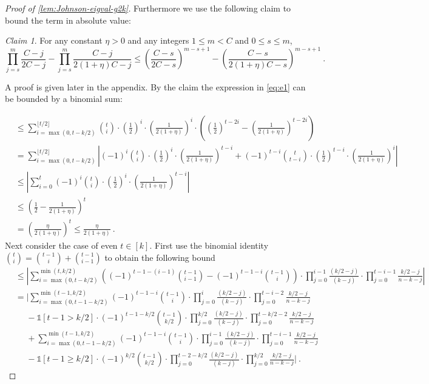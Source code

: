 \documentclass[10pt,a4paper]{article}
\newcommand{\prettyref}[1]{\cref{#1}}
\theoremstyle{definition}
\theoremstyle{remark}
\newtheorem{claim}[theorem]{Claim}
\renewcommand{\le}{\leqslant}
\renewcommand{\ge}{\geqslant}
\numberwithin{equation}{section}
\let\pref=\prettyref
\newcommand{\fl}[1]{\lfloor #1 \rfloor}
\begin{document}
\begin{proof}[Proof of \pref{lem:Johnson-eigval-g2k}]
    Furthermore we use the following claim to bound the term in absolute value: 

    \begin{claim}\label{claim:diff-bound}
        For any constant $\eta > 0$ and any integers $  1\le m < C$ and $0\le s \le m$,
        \[\prod_{j=s}^{m}\frac{C-j}{2C-j} - \prod_{j=s}^{m}\frac{C-j}{2(1+\eta)C-j} \le \left(\frac{C-s}{2C-s}\right)^{m-s+1} - \left(\frac{C-s}{2(1+\eta)C-s}\right)^{m-s+1}~.\]
    \end{claim}
    A proof is given later in the appendix. By the claim the expression in \pref{eq:e1} can be bounded by a binomial sum:

     \begin{align*}
         &\le \sum_{i=\max(0,t-k/2)}^{\fl{t/2}} \binom{t}{i} \cdot \left(\frac{1}{2}\right)^{i}  \cdot \left(\frac{1}{2(1+\eta)}\right)^{i} \cdot \left( \left(\frac{1}{2}\right)^{t-2i} - \left(\frac{1}{2(1+\eta)}\right)^{t-2i} \right) \\
         &= \sum_{i=\max(0,t-k/2)}^{\fl{t/2}} \left| (-1)^{i} \binom{t}{i} \cdot  \left(\frac{1}{2}\right)^{i} \cdot \left(\frac{1}{2(1+\eta)}\right)^{t-i} +  (-1)^{t-i} \binom{t}{t-i} \cdot \left(\frac{1}{2}\right)^{t-i} \cdot \left(\frac{1}{2(1+\eta)}\right)^{i} \right| \\
         &\le \left| \sum_{i=0}^t (-1)^{i} \binom{t}{i} \cdot \left(\frac{1}{2}\right)^{i} \cdot \left(\frac{1}{2(1+\eta)}\right)^{t-i} \right|\\
         &\le \left(\frac{1}{2} - \frac{1}{2(1+\eta)} \right)^t \\
         &=\left (\frac{\eta}{2(1+\eta)} \right)^t 
 \le\frac{\eta}{2(1+\eta)}~.
     \end{align*}
    Next consider the case of even $t\in[k]$. First use the binomial identity $\binom{t}{i} = \binom{t-1}{i}+ \binom{t-1}{i-1}$ to obtain the following bound
    \begin{align*}
        &\le \left|\sum_{i=\max(0,t-k/2) }^{ \min(t,k/2) } \left((-1)^{t-1-(i-1)}\binom{t-1}{i-1} - (-1)^{t-1-i} \binom{t-1}{i} \right)\cdot  \prod_{j=0}^{i-1} \frac{ (k/2-j)}{(k-j)} \cdot \prod_{j=0}^{t-i-1} \frac{  k/2-j}{ n-k-j}  \right|\\
        &=|\sum_{i=\max(0,t-1-k/2) }^{ \min(t-1,k/2)} (-1)^{t-1-i}\binom{t-1}{i}\cdot  \prod_{j=0}^{i} \frac{ (k/2-j)}{(k-j)} \cdot \prod_{j=0}^{t-i-2} \frac{  k/2-j}{ n-k-j} \\
        &~~~~~~- \mathbb{1}[t-1>k/2] \cdot   (-1)^{t-1-k/2}\binom{t-1}{k/2}\cdot  \prod_{j=0}^{k/2} \frac{ (k/2-j)}{(k-j)} \cdot \prod_{j=0}^{t-k/2-2} \frac{  k/2-j}{ n-k-j}\\
        &~~~~~~+\sum_{i=\max(0,t-1-k/2) }^{ \min(t-1,k/2)} (-1)^{t-1-i} \binom{t-1}{i} \cdot  \prod_{j=0}^{i-1} \frac{ (k/2-j)}{(k-j)} \cdot \prod_{j=0}^{t-i-1} \frac{  k/2-j}{ n-k-j} \\
        &~~~~~~- \mathbb{1}[t-1\ge k/2] \cdot   (-1)^{k/2}\binom{t-1}{k/2}\cdot  \prod_{j=0}^{t-2-k/2} \frac{ (k/2-j)}{(k-j)} \cdot \prod_{j=0}^{k/2} \frac{  k/2-j}{ n-k-j} |~.
    \end{align*}


\end{proof}
\end{document}
